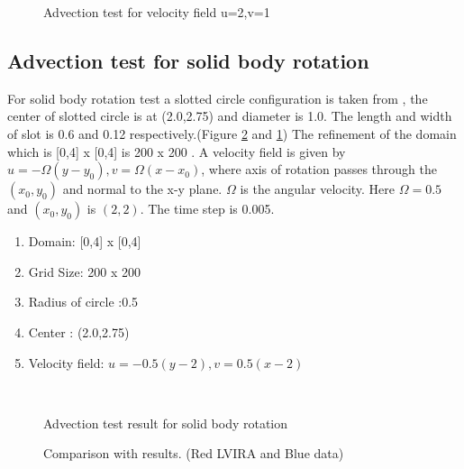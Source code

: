 \begin{figure}%
 \centering
 \caption{Advection test for velocity field u=2,v=1}
\end{figure}

\subsection{Advection test for solid body rotation}
For solid body rotation test a slotted circle configuration is taken from \cite{Zalesak1979}, the center of slotted circle is at
(2.0,2.75) and diameter is 1.0. The length and width of slot is 0.6 and 0.12 respectively.(Figure \ref{Fig:rotation} and \ref{Fig:rotation2})  
The refinement of the domain which is [0,4] x [0,4] is 200 x 200 . A velocity field is given by $u=-\Omega(y-y_0),v=\Omega(x-x_0)$, 
where axis of rotation passes through the $(x_0,y_0)$ and normal to the x-y plane. $\Omega$ is the angular velocity. 
Here $\Omega = 0.5$ and $(x_0,y_0)$ is $(2,2)$. The time step is 0.005.
\begin{enumerate}
 \item Domain: [0,4] x [0,4]
 \item Grid Size: 200 x 200
 \item Radius of circle :0.5
 \item Center : (2.0,2.75)
 \item Velocity field:  $u=-0.5(y-2),v=0.5(x-2)$
\end{enumerate}

% 
\begin{figure}
     \\
 \caption{Advection test result for solid body rotation}
 \label{Fig:rotation2}
\end{figure}
% 
\begin{figure}
 \centering 
 \caption{Comparison with \cite{Rudman1997} results. (Red LVIRA and Blue \cite{Rudman1997} data)}
 \label{Fig:rotation}
\end{figure}

